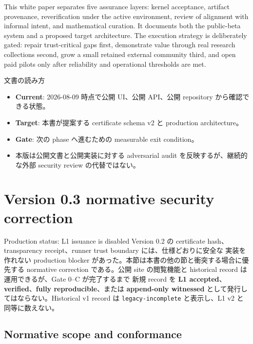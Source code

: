 \documentclass[a4paper,11pt]{ltjsarticle}
\newcommand{\term}[1]{\textbf{\color{TFNavy}#1}}
\newcommand{\code}[1]{\texttt{#1}}
\begin{document}
This white paper separates five assurance layers: kernel acceptance, artifact provenance,
reverification under the active environment, review of alignment with informal intent, and
mathematical curation. It documents both the public-beta system and a proposed target architecture.
The execution strategy is deliberately gated: repair trust-critical gaps first, demonstrate value
through real research collections second, grow a small retained external community third, and open
paid pilots only after reliability and operational thresholds are met.

\begin{decisionbox}{文書の読み方}
\begin{itemize}
  \item \term{Current}: 2026-08-09 時点で公開 UI、公開 API、公開 repository から確認できる状態。
  \item \term{Target}: 本書が提案する certificate schema v2 と production architecture。
  \item \term{Gate}: 次の phase へ進むための measurable exit condition。
  \item 本版は公開文書と公開実装に対する adversarial audit を反映するが、継続的な外部 security review の代替ではない。
\end{itemize}
\end{decisionbox}

\tableofcontents
\clearpage
{}

\section{Version 0.3 normative security correction}

\begin{warningbox}{Production status: L1 issuance is disabled}
Version 0.2 の certificate hash、transparency receipt、runner trust boundary には、仕様どおりに安全な
実装を作れない production blocker があった。本節は本書の他の節と衝突する場合に優先する normative
correction である。公開 site の閲覧機能と historical record は運用できるが、Gate 0--C が完了するまで
新規 record を \term{L1 accepted}、\term{verified}、\term{fully reproducible}、または
\term{append-only witnessed} として発行してはならない。Historical v1 record は
\code{legacy-incomplete} と表示し、L1 v2 と同等に数えない。
\end{warningbox}

\subsection{Normative scope and conformance}
\end{document}
